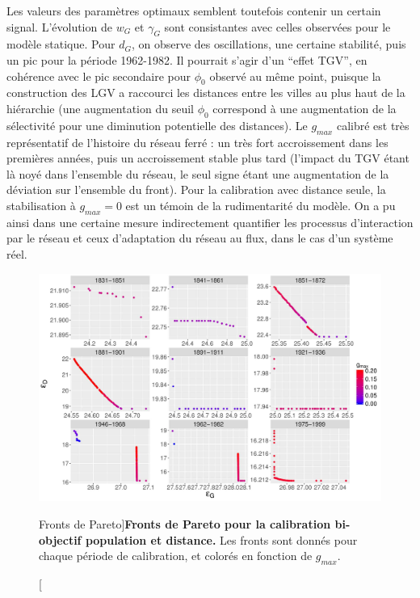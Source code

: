 Les valeurs des paramètres optimaux semblent toutefois contenir un certain signal. L'évolution de $w_G$ et $\gamma_G$ sont consistantes avec celles observées pour le modèle statique. Pour $d_G$, on observe des oscillations, une certaine stabilité, puis un pic pour la période 1962-1982. Il pourrait s'agir d'un ``effet TGV'', en cohérence avec le pic secondaire pour $\phi_0$ observé au même point, puisque la construction des LGV a raccourci les distances entre les villes au plus haut de la hiérarchie (une augmentation du seuil $\phi_0$ correspond à une augmentation de la sélectivité pour une diminution potentielle des distances). Le $g_{max}$ calibré est très représentatif de l'histoire du réseau ferré : un très fort accroissement dans les premières années, puis un accroissement stable plus tard (l'impact du TGV étant là noyé dans l'ensemble du réseau, le seul signe étant une augmentation de la déviation sur l'ensemble du front). Pour la calibration avec distance seule, la stabilisation à $g_{max}=0$ est un témoin de la rudimentarité du modèle. On a pu ainsi dans une certaine mesure indirectement quantifier les processus d'interaction par le réseau et ceux d'adaptation du réseau au flux, dans le cas d'un système réel.

\begin{figure}
	\includegraphics[width=\linewidth]{Figures/Final/6-2-3-fig-macrocoevol-pareto.jpg}
	\caption[Pareto fronts][Fronts de Pareto]{\label{fig:macrocoevol:pareto}}{\textbf{Fronts de Pareto pour la calibration bi-objectif population et distance.} Les fronts sont donnés pour chaque période de calibration, et colorés en fonction de $g_{max}$.\label{fig:macrocoevol:pareto}}
\end{figure}



